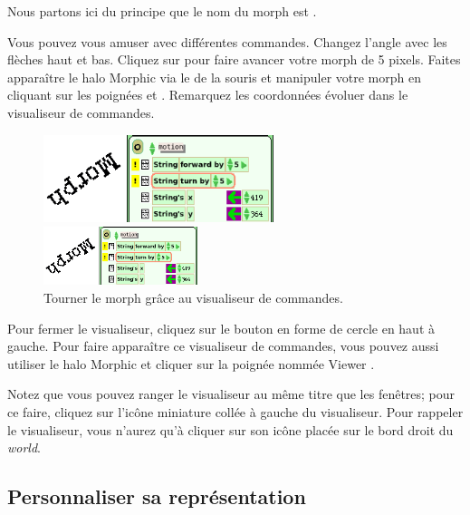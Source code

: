 \documentclass[a4paper,10pt,twoside]{book}
\begin{document}
Nous partons ici du principe que le nom du morph est .


Vous pouvez vous amuser avec différentes commandes. Changez l'angle
avec les flèches haut et bas. Cliquez sur 
pour faire avancer votre morph de 5 pixels. Faites apparaître le halo
Morphic via le  de la souris et manipuler votre
morph en cliquant sur les poignées \grabHandle{} et \rotateHandle{}.
Remarquez les coordonnées évoluer dans le visualiseur de commandes.

\begin{figure}[ht]
	\ifluluelse
		{\centerline{\includegraphics[width=0.6\textwidth]{turningInViewer}}}
		{\centerline{\includegraphics[width=0.4\textwidth]{turningInViewer}}}
	\caption{Tourner le morph grâce au visualiseur de commandes.\label{fig:turningInViewer}}
\end{figure}

Pour fermer le visualiseur, cliquez sur le bouton en forme de cercle
en haut \`a gauche. Pour faire apparaître ce visualiseur de
commandes, vous pouvez aussi utiliser le halo Morphic et cliquer sur
la poignée nommée Viewer \viewerHandle{}.
   
Notez que vous pouvez ranger le visualiseur au même titre que les
fenêtres; pour ce faire, cliquez sur l'icône miniature collée \`a
gauche du visualiseur. Pour rappeler le visualiseur, vous n'aurez
qu'\`a cliquer sur son icône placée sur le bord droit du \emph{world}.

\subsection{Personnaliser sa représentation}
\end{document}
